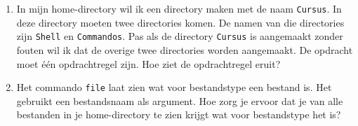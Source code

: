 \begin{enumerate}
\item In mijn home-directory wil ik een directory maken met de naam \texttt{Cursus}. In deze directory moeten twee directories komen. De namen van die directories zijn \texttt{Shell} en \texttt{Commandos}. Pas als de directory \texttt{Cursus} is aangemaakt zonder fouten wil ik dat de overige twee directories worden aangemaakt. De opdracht moet \'e\'en opdrachtregel zijn. Hoe ziet de opdrachtregel eruit?
\item Het commando \texttt{file} laat zien wat voor bestandstype een bestand is. Het gebruikt een bestandsnaam als argument. Hoe zorg je ervoor dat je van alle bestanden in je home-directory te zien krijgt wat voor bestandstype het is?
\end{enumerate}
